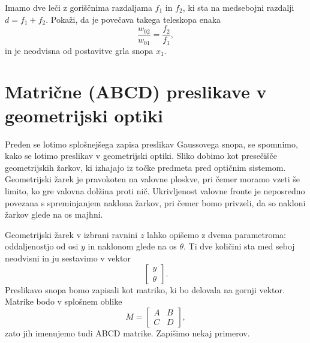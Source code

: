 \begin{definition}
\label{teleskop}
Imamo dve leči z goriščnima razdaljama $f_{1}$ in $f_{2}$, ki sta na medsebojni
razdalji $d=f_{1}+f_{2}$. Pokaži, da je povečava takega teleskopa enaka  
\begin{equation}
\frac{w_{02}}{w_{01}}=\frac{f_{2}}{f_{1}},
\label{eq:povecava-teleskop}
\end{equation}
in je neodvisna od postavitve grla snopa $x_{1}$.
\end{definition}


\section{Matrične (ABCD) preslikave v geometrijski optiki}

Preden se lotimo splošnejšega zapisa preslikav Gaussovega snopa, se spomnimo, kako
se lotimo preslikav v geometrijski optiki. 
Sliko dobimo kot presečišče geometrijskih žarkov,
ki izhajajo iz točke predmeta pred optičnim sistemom. Geometrijski
žarek je pravokoten na valovne ploskve, pri čemer moramo vzeti še limito,
ko gre valovna dolžina proti nič. Ukrivljenost valovne fronte je neposredno
povezana s spreminjanjem naklona žarkov, pri čemer bomo privzeli, da so 
nakloni žarkov glede na os majhni.


Geometrijski žarek v izbrani ravnini $z$ lahko opišemo z dvema parametroma: 
oddaljenostjo od osi $y$ in naklonom glede na os $\theta$. Ti dve količini 
sta med seboj neodvisni in ju sestavimo 
v vektor
\begin{equation}
\left[\begin{array}{c}
y\\
\theta
\end{array}\right].
\end{equation}
Preslikavo snopa bomo zapisali kot matriko, ki bo delovala na gornji vektor. 
Matrike bodo v splošnem oblike
\begin{equation}
M = \left[\begin{array}{cc}
A & B\\
C & D
\end{array}\right],
\end{equation}
zato jih imenujemo tudi ABCD matrike. Zapišimo nekaj primerov.


